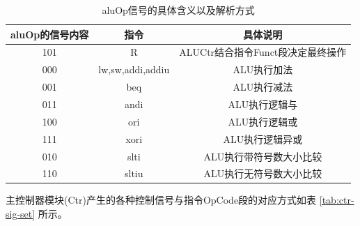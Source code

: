 \documentclass[UTF8]{ctexart}
\begin{document}
\begin{table}[htbp]
    \centering
    \begin{tabular}{|c|c|c|}
        \hline
        aluOp的信号内容 & 指令 & 具体说明 \\ \hline
        101 & R & ALUCtr结合指令Funct段决定最终操作 \\
        000 & lw,sw,addi,addiu & ALU执行加法 \\
        001 & beq & ALU执行减法 \\
        011 & andi & ALU执行逻辑与 \\
        100 & ori & ALU执行逻辑或 \\
        111 & xori & ALU执行逻辑异或 \\
        010 & slti & ALU执行带符号数大小比较 \\
        110 & sltiu & ALU执行无符号数大小比较 \\ 
        \hline
    \end{tabular}
    \caption{aluOp信号的具体含义以及解析方式}
    \label{tab-aluop-sig}
\end{table}\par
主控制器模块(Ctr)产生的各种控制信号与指令OpCode段的对应方式如表 \ref{tab:ctr-sig-set} 所示。\par
\end{document}
